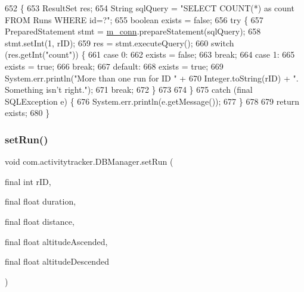 \begin{DoxyCode}
652                                             \{
653         ResultSet res;
654         String sqlQuery = \textcolor{stringliteral}{"SELECT COUNT(*) as count FROM Runs WHERE id=?"};
655         \textcolor{keywordtype}{boolean} exists = \textcolor{keyword}{false};
656         \textcolor{keywordflow}{try} \{
657             PreparedStatement stmt = \mbox{\hyperlink{classcom_1_1activitytracker_1_1_d_b_manager_a064088d13ac09eb147fdc19268771521}{m\_conn}}.prepareStatement(sqlQuery);
658             stmt.setInt(1, rID);
659             res = stmt.executeQuery();
660             \textcolor{keywordflow}{switch} (res.getInt(\textcolor{stringliteral}{"count"})) \{
661                 \textcolor{keywordflow}{case} 0:
662                     exists = \textcolor{keyword}{false};
663                     \textcolor{keywordflow}{break};
664                 \textcolor{keywordflow}{case} 1:
665                     exists = \textcolor{keyword}{true};
666                     \textcolor{keywordflow}{break};
667                 \textcolor{keywordflow}{default}:
668                     exists = \textcolor{keyword}{true};
669                     System.err.println(\textcolor{stringliteral}{"More than one run for ID "} +
670                             Integer.toString(rID) + \textcolor{stringliteral}{". Something isn't right."});
671                     \textcolor{keywordflow}{break};
672             \}
673 
674         \}
675         \textcolor{keywordflow}{catch} (\textcolor{keyword}{final} SQLException e) \{
676             System.err.println(e.getMessage());
677         \}
678 
679         \textcolor{keywordflow}{return} exists;
680     \}
\end{DoxyCode}
\mbox{\label{classcom_1_1activitytracker_1_1_d_b_manager_aa088e156858d8d661e2f43c1054c51c8}} 
\subsubsection{\texorpdfstring{set\+Run()}{setRun()}}
{\footnotesize\ttfamily void com.\+activitytracker.\+D\+B\+Manager.\+set\+Run (\begin{DoxyParamCaption}\item[{final int}]{r\+ID,  }\item[{final float}]{duration,  }\item[{final float}]{distance,  }\item[{final float}]{altitude\+Ascended,  }\item[{final float}]{altitude\+Descended }\end{DoxyParamCaption})}

